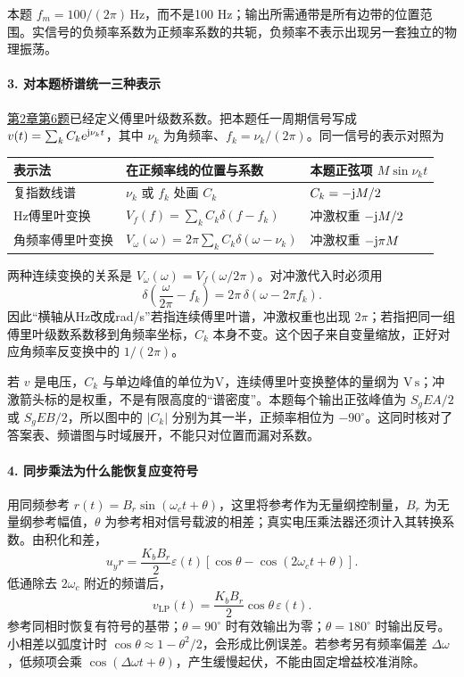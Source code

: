 本题 $f_m=100/(2\pi)\,\mathrm{Hz}$，而不是100 Hz；输出所需通带是所有边带的位置范围。实信号的负频率系数为正频率系数的共轭，负频率不表示出现另一套独立的物理振荡。

\paragraph{3. 对本题桥谱统一三种表示}
\hyperref[kn:2-6]{第2章第6题}已经定义傅里叶级数系数。把本题任一周期信号写成
$v(t)=\sum_kC_ke^{\mathrm{j}\nu_kt}$，其中 $\nu_k$ 为角频率、$f_k=\nu_k/(2\pi)$。同一信号的表示对照为
\begin{center}\small
\begin{tabularx}{\linewidth}{@{}p{2.7cm}X>{\raggedright\arraybackslash}p{2.8cm}@{}}
\toprule
表示法 & 在正频率线的位置与系数 & 本题正弦项 $M\sin\nu_kt$\\
\midrule
复指数线谱 & $\nu_k$ 或 $f_k$ 处画 $C_k$ & $C_k=-\mathrm{j} M/2$\\
Hz傅里叶变换 & $V_f(f)=\sum_kC_k\delta(f-f_k)$ & 冲激权重 $-\mathrm{j} M/2$\\
角频率傅里叶变换 & $V_\omega(\omega)=2\pi\sum_kC_k\delta(\omega-\nu_k)$ & 冲激权重 $-\mathrm{j}\pi M$\\
\bottomrule
\end{tabularx}
\end{center}
两种连续变换的关系是 $V_\omega(\omega)=V_f(\omega/2\pi)$。对冲激代入时必须用
\[
\delta\!\left(\frac{\omega}{2\pi}-f_k\right)
=2\pi\,\delta(\omega-2\pi f_k).
\]
因此“横轴从Hz改成rad/s”若指连续傅里叶谱，冲激权重也出现 $2\pi$；若指把同一组傅里叶级数系数移到角频率坐标，$C_k$ 本身不变。这个因子来自变量缩放，正好对应角频率反变换中的 $1/(2\pi)$。

若 $v$ 是电压，$C_k$ 与单边峰值的单位为V，连续傅里叶变换整体的量纲为 $\mathrm{V\,s}$；冲激箭头标的是权重，不是有限高度的“谱密度”。本题每个输出正弦峰值为 $S_gEA/2$ 或 $S_gEB/2$，所以图中的 $|C_k|$ 分别为其一半，正频率相位为 $-90^\circ$。这同时核对了答案表、频谱图与时域展开，不能只对位置而漏对系数。

\paragraph{4. 同步乘法为什么能恢复应变符号}
用同频参考 $r(t)=B_r\sin(\omega_ct+\theta)$，这里将参考作为无量纲控制量，$B_r$ 为无量纲参考幅值，$\theta$ 为参考相对信号载波的相差；真实电压乘法器还须计入其转换系数。由积化和差，
\[
u_yr=\frac{K_bB_r}{2}\varepsilon(t)
\left[\cos\theta-\cos(2\omega_ct+\theta)\right].
\]
低通除去 $2\omega_c$ 附近的频谱后，
\[
\boxed{v_{\mathrm{LP}}(t)
=\frac{K_bB_r}{2}\cos\theta\,\varepsilon(t)}.
\]
参考同相时恢复有符号的基带；$\theta=90^\circ$ 时有效输出为零；$\theta=180^\circ$ 时输出反号。小相差以弧度计时 $\cos\theta\approx1-\theta^2/2$，会形成比例误差。若参考另有频率偏差 $\Delta\omega$，低频项会乘 $\cos(\Delta\omega t+\theta)$，产生缓慢起伏，不能由固定增益校准消除。

